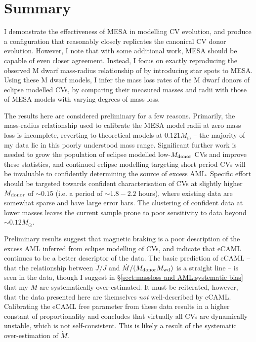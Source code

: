 \section{Summary}

I demonstrate the effectiveness of MESA in modelling CV evolution, and produce a configuration that reasonably closely replicates the canonical CV donor evolution. However, I note that with some additional work, MESA should be capable of even closer agreement.
Instead, I focus on exactly reproducing the observed M dwarf mass-radius relationship of \citet{brown2022} by introducing star spots to MESA.
Using these M dwarf models, I infer the mass loss rates of the M dwarf donors of eclipse modelled CVs, by comparing their measured masses and radii with those of MESA models with varying degrees of mass loss.

The results here are considered preliminary for a few reasons. Primarily, the mass-radius relationship used to calibrate the MESA model radii at zero mass loss is incomplete, reverting to theoretical models at $0.121 M_\odot$ -- the majority of my data lie in this poorly understood mass range.
Significant further work is needed to grow the population of eclipse modelled low-$M_{\rm donor}$ CVs and improve these statistics, and continued eclipse modelling targeting short period CVs will be invaluable to confidently determining the source of excess AML.
Specific effort should be targeted towards confident characterisation of CVs at slightly higher $M_{\rm donor}$ of $\sim0.15$ (i.e. a period of $\sim 1.8 - 2.2$ hours), where existing data are somewhat sparse and have large error bars. The clustering of confident data at lower masses leaves the current sample prone to poor sensitivity to data beyond $\sim 0.12 M_\odot$.

Preliminary results suggest that magnetic braking is a poor description of the excess AML inferred from eclipse modelling of CVs, and indicate that eCAML continues to be a better descriptor of the data.
The basic prediction of eCAML -- that the relationship between $\dot J / J$ and $\dot M / (M_{\rm donor} M_{\rm wd})$ is a straight line -- is seen in the data, though I suggest in \S\ref{sect:massloss and AML:systematic bias} that my $\dot M$ are systematically over-estimated.
It must be reiterated, however, that the data presented here are themselves \textit{not} well-described by eCAML.
 Calibrating the eCAML free parameter from these data results in a higher constant of proportionality and concludes that virtually all CVs are dynamically unstable, which is not self-consistent. This is likely a result of the systematic over-estimation of $\dot M$.


